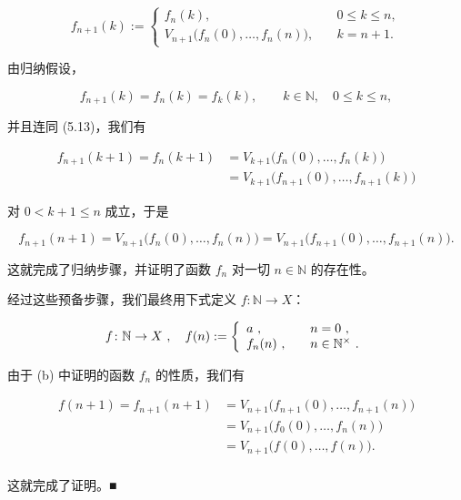 \begin{proposition}
\begin{items}
\begin{equation}
f_{n+1}(k):=\left\{\begin{array}{ll}f_{n}(k),&\quad0\leq k\leq n,\\ V_{n+1}\big(f_{n}(0),\ldots,f_{n}(n)\big),&\quad k=n+1.\end{array}\right.
\end{equation}

由归纳假设，

\[
f_{n+1}(k)=f_{n}(k)=f_{k}(k),\qquad k\in\mathbb{N},\quad0\leq k\leq n,
\]

并且连同 (5.13)，我们有

\begin{equation*}
\begin{aligned}
f_{n+1}(k+1)=f_{n}(k+1)&=V_{k+1}\big(f_{n}(0),\ldots,f_{n}(k)\big)\\&=V_{k+1}\big(f_{n+1}(0),\ldots,f_{n+1}(k)\big)
\end{aligned}
\end{equation*}

对 $0 < k + 1 \leq n$ 成立，于是

\[
f_{n+1}(n+1)=V_{n+1}\big(f_{n}(0),\ldots,f_{n}(n)\big)=V_{n+1}\big(f_{n+1}(0),\ldots,f_{n+1}(n)\big).
\]

这就完成了归纳步骤，并证明了函数 $ f_n $ 对一切 $ n \in \mathbb{N} $ 的存在性。

\item

经过这些预备步骤，我们最终用下式定义 $ f: \mathbb{N} \to X $：

\begin{equation*}
f\colon\mathbb{N}\to X~,\quad f(n):=\left\{\begin{array}{l l}{a~,}&{\quad n=0~,}\\ {f_{n}(n)~,}&{\quad n\in\mathbb{N}^{\times}~.}\\ \end{array}\right.
\end{equation*}

由于 (b) 中证明的函数 $ f_{n} $ 的性质，我们有

\begin{equation}
\begin{aligned}
f(n+1)=f_{n+1}(n+1)&=V_{n+1}\big(f_{n+1}(0),\ldots,f_{n+1}(n)\big)\\&=V_{n+1}\big(f_{0}(0),\ldots,f_{n}(n)\big)\\&=V_{n+1}\big(f(0),\ldots,f(n)\big).\\
\end{aligned}
\end{equation}

这就完成了证明。■

\end{items}

\end{proposition}

